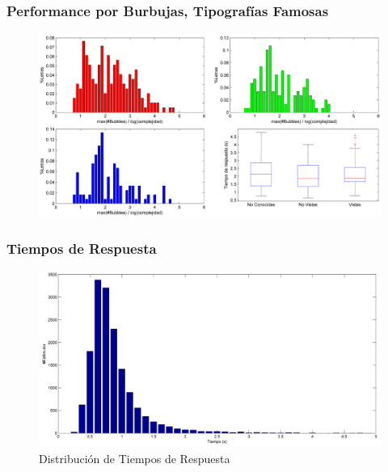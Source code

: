 \documentclass[10pt]{beamer}
\begin{document}
 	\begin{frame}
	\frametitle{Performance por Burbujas, Tipografías Famosas}
	    \begin{figure}
		\includegraphics[width=\textwidth]{graficos/BubblesLogComplejidad_PorFamosas.png}
	    \end{figure}
	\end{frame}

   	\begin{frame}
	\frametitle{Tiempos de Respuesta}
	    \begin{figure}
		\includegraphics[width=\textwidth]{graficos/tiempoRespuesta_dist.png}
		\caption{Distribución de Tiempos de Respuesta}
	    \end{figure}
	\end{frame}
\end{document}
